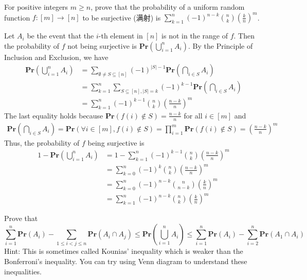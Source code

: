 \documentclass[a4paper, justified]{tufte-handout}
\begin{document}
\begin{problem}[Surjection]
  For positive integers $m \ge n$, prove that the probability of a uniform random function $f:[m]\to[n]$ to be surjective (满射) is $\displaystyle{\sum_{k=1}^n(-1)^{n-k}{n\choose k}\left(\frac{k}{n}\right)^m}$. 
\end{problem}

\begin{solution}
  Let $A_i$ be the event that the $i$-th element in $[n]$ is not in the range of $f$. Then the probability of $f$ not being surjective is $\mathbf{Pr}\left(\bigcup_{i=1}^n A_i\right)$. By the Principle of Inclusion and Exclusion, we have
  \[\begin{aligned}
    \mathbf{Pr}\left(\bigcup_{i=1}^n A_i\right) &= \sum_{\emptyset \neq S \subseteq [n]} (-1)^{|S|-1} \mathbf{Pr}\left(\bigcap_{i \in S} A_i\right)\\
    &= \sum_{k=1}^n \sum_{S \subseteq [n], |S|=k} (-1)^{k-1} \mathbf{Pr}\left(\bigcap_{i \in S} A_i\right)\\
    &= \sum_{k=1}^n (-1)^{k-1} {n \choose k} \left(\frac{n-k}{n}\right)^m
  \end{aligned}
  \]
  The last equality holds because $\mathbf{Pr} \left(f(i) \notin S\right) = \frac{n-k}{n}$ for all $i \in [m]$ and
  \[
  \begin{aligned}
    \mathbf{Pr}\left(\bigcap_{i \in S} A_i\right) = \mathbf{Pr}\left(\forall i \in [m], f(i) \notin S\right)
    = \prod_{i=1}^m \mathbf{Pr}\left(f(i) \notin S\right)
    = \left(\frac{n-k}{n}\right)^m
  \end{aligned}
  \]
  Thus, the probability of $f$ being surjective is
  \[\begin{aligned}
    1 - \mathbf{Pr}\left(\bigcup_{i=1}^n A_i\right) &= 1 - \sum_{k=1}^n (-1)^{k-1} {n \choose k} \left(\frac{n-k}{n}\right)^m\\
    &= \sum_{k=0}^n (-1)^k {n \choose k} \left(\frac{n-k}{n}\right)^m\\
    &= \sum_{k=0}^n (-1)^{n-k} {n \choose n-k} \left(\frac{k}{n}\right)^m\\
    &= \sum_{k=1}^n (-1)^{n-k} {n \choose k} \left(\frac{k}{n}\right)^m
  \end{aligned}
  \]
\end{solution}

\begin{problem}
  Prove that 
  \[\sum_{i=1}^n \mathbf{Pr}(A_i) - \sum_{1 \le i < j \le n} \mathbf{Pr}(A_i \cap A_j)\le \mathbf{Pr}\left(\bigcup_{i=1}^n A_i\right) \le \sum_{i=1}^n \mathbf{Pr} \left( A_i\right) - \sum_{i=2}^n \mathbf{Pr}(A_1 \cap A_i)
  \]
  Hint: This is sometimes called Kounias' inequality which is weaker than the Bonferroni's inequality. You can try using Venn diagram to understand these inequalities. 
\end{problem}
\end{document}
